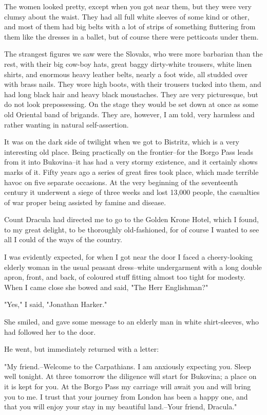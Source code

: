 The women looked pretty, except when you got near them, but they were very clumsy about the waist. They had all full white sleeves of some kind or other, and most of them had big belts with a lot of strips of something fluttering from them like the dresses in a ballet, but of course there were petticoats under them. 

The strangest figures we saw were the Slovaks, who were more barbarian than the rest, with their big cow-boy hats, great baggy dirty-white trousers, white linen shirts, and enormous heavy leather belts, nearly a foot wide, all studded over with brass nails. They wore high boots, with their trousers tucked into them, and had long black hair and heavy black moustaches. They are very picturesque, but do not look prepossessing. On the stage they would be set down at once as some old Oriental band of brigands. They are, however, I am told, very harmless and rather wanting in natural self-assertion. 

It was on the dark side of twilight when we got to Bistritz, which is a very interesting old place. Being practically on the frontier--for the Borgo Pass leads from it into Bukovina--it has had a very stormy existence, and it certainly shows marks of it. Fifty years ago a series of great fires took place, which made terrible havoc on five separate occasions. At the very beginning of the seventeenth century it underwent a siege of three weeks and lost 13,000 people, the casualties of war proper being assisted by famine and disease. 

Count Dracula had directed me to go to the Golden Krone Hotel, which I found, to my great delight, to be thoroughly old-fashioned, for of course I wanted to see all I could of the ways of the country. 

I was evidently expected, for when I got near the door I faced a cheery-looking elderly woman in the usual peasant dress--white undergarment with a long double apron, front, and back, of coloured stuff fitting almost too tight for modesty. When I came close she bowed and said, "The Herr Englishman?" 

"Yes," I said, "Jonathan Harker." 

She smiled, and gave some message to an elderly man in white shirt-sleeves, who had followed her to the door. 

He went, but immediately returned with a letter: 

"My friend.--Welcome to the Carpathians. I am anxiously expecting you. Sleep well tonight. At three tomorrow the diligence will start for Bukovina; a place on it is kept for you. At the Borgo Pass my carriage will await you and will bring you to me. I trust that your journey from London has been a happy one, and that you will enjoy your stay in my beautiful land.--Your friend, Dracula." 


